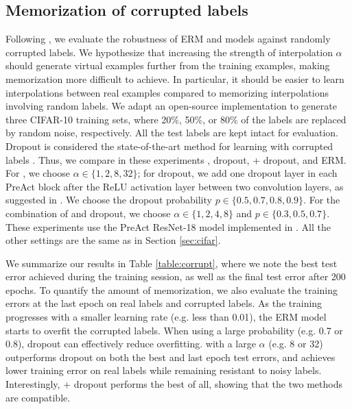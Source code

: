 \subsection{Memorization of corrupted labels}
\label{sec:corrupt}

Following \cite{2016arXiv161103530Z}, we evaluate the robustness of ERM and
\mixup{} models against randomly corrupted labels.  We hypothesize that
increasing the strength of \mixup{} interpolation $\alpha$ should generate
virtual examples further from the training examples, making memorization more
difficult to achieve.  In particular, it should be easier to learn
interpolations between real examples compared to memorizing interpolations
involving random labels. We adapt an open-source implementation
\citep{random-labels} to generate three CIFAR-10 training sets, where 20\%,
50\%, or 80\% of the labels are replaced by random noise, respectively. All the
test labels are kept intact for evaluation. Dropout
\citep{srivastava2014dropout} is considered the state-of-the-art method for
learning with corrupted labels \citep{arpit2017closer}. Thus, we compare in
these experiments \mixup{}, dropout, \mixup{} + dropout, and ERM. For \mixup{}, we choose $\alpha
\in \{1, 2, 8, 32\}$; for dropout, we add one dropout layer in each PreAct
block after the ReLU activation layer between two convolution layers, as
suggested in \citep{Zagoruyko2016WRN}. We choose the dropout probability $p \in
\{0.5, 0.7, 0.8, 0.9\}$. For the combination of \mixup{} and dropout, we choose $\alpha\in\{1, 2, 4, 8\}$ and $p\in\{0.3, 0.5, 0.7\}$. These experiments use the PreAct ResNet-18
\citep{he2016identity} model implemented in \citep{cifar-pytorch}. All the
other settings are the same as in Section \ref{sec:cifar}.

We summarize our results in Table \ref{table:corrupt}, where we note the best
test error achieved during the training session, as well as the final test
error after 200 epochs. To quantify the amount of memorization, we also
evaluate the training errors at the last epoch on real labels and corrupted
labels. As the training progresses with a smaller learning rate (e.g. less than
0.01), the ERM model starts to overfit the corrupted labels. When using a large
probability (e.g. 0.7 or 0.8), dropout can effectively reduce overfitting.
\mixup{} with a large $\alpha$ (e.g. 8 or 32) outperforms
dropout on both the best and last epoch test errors, and achieves lower
training error on real labels while remaining resistant to noisy labels. Interestingly, \mixup{} + dropout performs the best of all, showing that the two methods are compatible.

